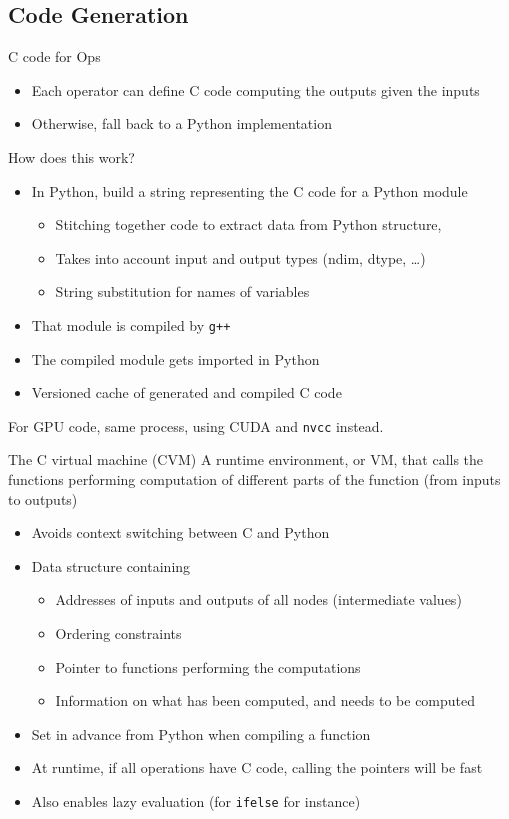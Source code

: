 \documentclass[a4paper,9pt]{beamer}
\begin{document}
\subsection{Code Generation}
\begin{frame}[fragile]{C code for Ops}
  \begin{itemize}
    \item Each operator can define C code computing the outputs given the inputs
    \item Otherwise, fall back to a Python implementation
  \end{itemize}
  How does this work?
  \begin{itemize}
    \item In Python, build a string representing the C code for a Python module
    \begin{itemize}
      \item Stitching together code to extract data from Python structure,
      \item Takes into account input and output types (ndim, dtype, \ldots)
      \item String substitution for names of variables
    \end{itemize}
    \item That module is compiled by \verb|g++|
    \item The compiled module gets imported in Python
    \item Versioned cache of generated and compiled C code
  \end{itemize}
  For GPU code, same process, using CUDA and \verb|nvcc| instead.
\end{frame}

\begin{frame}[fragile]{The C virtual machine (CVM)}
  A runtime environment, or VM, that calls the functions performing
  computation of different parts of the function (from inputs to
  outputs)
  \begin{itemize}
    \item Avoids context switching between C and Python
    \item Data structure containing
      \begin{itemize}
        \item Addresses of inputs and outputs of all nodes (intermediate values)
        \item Ordering constraints
        \item Pointer to functions performing the computations
        \item Information on what has been computed, and needs to be computed
      \end{itemize}
    \item Set in advance from Python when compiling a function
    \item At runtime, if all operations have C code, calling the pointers will be fast
    \item Also enables lazy evaluation (for \verb|ifelse| for instance)
  \end{itemize}
\end{frame}
\end{document}
